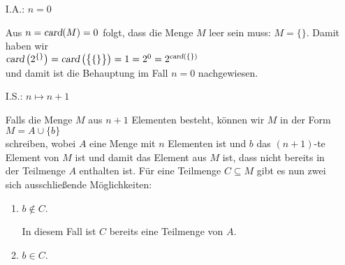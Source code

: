 \begin{enumerate}
\item[I.A.:] $n = 0$

     Aus $n = \textsl{card}(M) = 0$ folgt, dass die Menge $M$ leer sein muss: $M = \{\}$.
     Damit haben wir
     \\[0.2cm]
     \hspace*{1.3cm}
     $\textsl{card}\left(2^{\{\}}\right) = \textsl{card}\left(\bigl\{ \{\} \bigr\}\right)
       = 1 = 2^0 = 2^{\textsl{card}(\{\})}
     $
     \\[0.2cm]
     und damit ist die Behauptung im Fall $n = 0$ nachgewiesen.
\item[I.S.:] $n \mapsto n + 1$

     Falls die Menge $M$ aus $n+1$ Elementen besteht, k\"{o}nnen wir $M$ in der Form
     \\[0.2cm]
     \hspace*{1.3cm}
     $M = A \cup \{ b \}$
     \\[0.2cm]
     schreiben, wobei $A$ eine Menge mit $n$ Elementen ist und $b$ das $(n+1)$-te Element
     von $M$ ist und damit das Element aus $M$ ist, dass nicht bereits in der Teilmenge
     $A$ enthalten ist. 
     F\"{u}r eine Teilmenge $C \subseteq M$ gibt es nun zwei sich ausschließende M\"{o}glichkeiten:  
     \begin{enumerate}
     \item $b \not\in C$.
       
           In diesem Fall ist $C$ bereits eine Teilmenge von $A$.
     \item $b \in C$.


\end{enumerate}
\end{enumerate}
